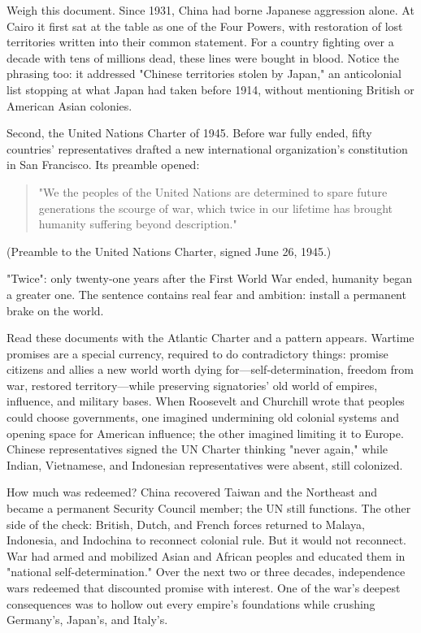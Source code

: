 Weigh this document. Since 1931, China had borne Japanese aggression alone. At Cairo it first sat at the table as one of the Four Powers, with restoration of lost territories written into their common statement. For a country fighting over a decade with tens of millions dead, these lines were bought in blood. Notice the phrasing too: it addressed "Chinese territories stolen by Japan," an anticolonial list stopping at what Japan had taken before 1914, without mentioning British or American Asian colonies.

Second, the United Nations Charter of 1945. Before war fully ended, fifty countries' representatives drafted a new international organization's constitution in San Francisco. Its preamble opened:

\begin{quote}
"We the peoples of the United Nations are determined to spare future generations the scourge of war, which twice in our lifetime has brought humanity suffering beyond description."
\end{quote}
(Preamble to the United Nations Charter, signed June 26, 1945.)

"Twice": only twenty-one years after the First World War ended, humanity began a greater one. The sentence contains real fear and ambition: install a permanent brake on the world.

Read these documents with the Atlantic Charter and a pattern appears. Wartime promises are a special currency, required to do contradictory things: promise citizens and allies a new world worth dying for---self-determination, freedom from war, restored territory---while preserving signatories' old world of empires, influence, and military bases. When Roosevelt and Churchill wrote that peoples could choose governments, one imagined undermining old colonial systems and opening space for American influence; the other imagined limiting it to Europe. Chinese representatives signed the UN Charter thinking "never again," while Indian, Vietnamese, and Indonesian representatives were absent, still colonized.

How much was redeemed? China recovered Taiwan and the Northeast and became a permanent Security Council member; the UN still functions. The other side of the check: British, Dutch, and French forces returned to Malaya, Indonesia, and Indochina to reconnect colonial rule. But it would not reconnect. War had armed and mobilized Asian and African peoples and educated them in "national self-determination." Over the next two or three decades, independence wars redeemed that discounted promise with interest. One of the war's deepest consequences was to hollow out every empire's foundations while crushing Germany's, Japan's, and Italy's.

